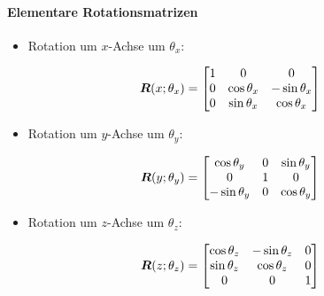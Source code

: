 			\paragraph{Elementare Rotationsmatrizen}
				\begin{itemize}
					\item Rotation um \(x\)-Achse um \(\theta_x\):
				\end{itemize}
				\begin{equation*}
					\bm{R}(x; \theta_x) =
					\begin{bmatrix}
						1 & 0            & 0             \\
						0 & \cos\theta_x & -\sin\theta_x \\
						0 & \sin\theta_x & \cos\theta_x
					\end{bmatrix}
				\end{equation*}
				\begin{itemize}
					\item Rotation um \(y\)-Achse um \(\theta_y\):
				\end{itemize}
				\begin{equation*}
					\bm{R}(y; \theta_y) =
					\begin{bmatrix}
						\cos\theta_y  & 0 & \sin\theta_y \\
						0             & 1 & 0            \\
						-\sin\theta_y & 0 & \cos\theta_y
					\end{bmatrix}
				\end{equation*}
				\begin{itemize}
					\item Rotation um \(z\)-Achse um \(\theta_z\):
				\end{itemize}
				\begin{equation*}
					\bm{R}(z; \theta_z) =
					\begin{bmatrix}
						\cos\theta_z & -\sin\theta_z & 0 \\
						\sin\theta_z & \cos\theta_z  & 0 \\
						0            & 0             & 1
					\end{bmatrix}
				\end{equation*}

